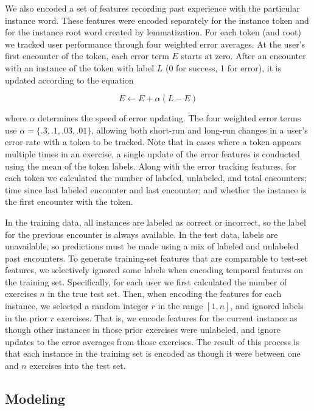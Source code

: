 \documentclass[11pt,a4paper]{article}
\begin{document}
We also encoded a set of features recording past experience with
the particular instance word. These features were encoded separately for the
instance token and for the instance root word created by lemmatization.
For each token (and root) we tracked user performance through four weighted
error averages. At the user's first encounter of the token, each error term $E$ starts at
zero. After an encounter with an instance of the token with label $L$ (0 for
success, 1 for error), it is
updated according to the equation

\[
E \leftarrow E + \alpha (L - E)
\]

where $\alpha$ determines the speed of error updating. The four weighted
error terms use $\alpha = \{.3, .1, .03, .01\}$, allowing both short-run and
long-run changes in a user's error rate with a token to be tracked. Note that in
cases where a token appears multiple times in an exercise, a single update of
the error features is conducted using the mean of the token labels.
Along with the error tracking features, for each token we calculated the number
of labeled, unlabeled, and total encounters; time since last labeled encounter and
last encounter; and whether the instance is the first encounter with the
token.

In the training data, all instances are labeled as correct or incorrect, so the
label for the previous encounter is always available. In the test data, labels
are unavailable, so predictions must be made using a mix of labeled and
unlabeled past encounters. To generate training-set features that are 
comparable to test-set features, we selectively ignored some labels when encoding temporal features on
the training set. Specifically, for each user we first calculated the number of
exercises $n$ in the true test set. Then, when encoding the features for each
instance, we selected a random integer $r$ in the range $[1,n]$, and ignored labels
in the prior $r$ exercises. That is, we encode features for the current instance
as though other instances in those prior exercises were unlabeled, and ignore
updates to the error averages from those exercises. The result of this process
is that each instance in the training set is encoded as though it were between
one and $n$ exercises into the test set.

\subsection{Modeling}
\end{document}
